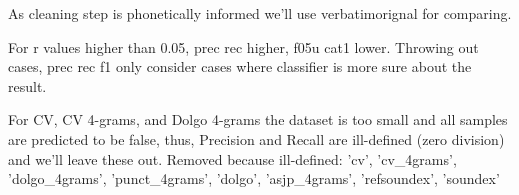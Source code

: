 

As cleaning step is phonetically informed we'll use verbatimorignal for comparing.

For r values higher than 0.05, prec rec higher, f05u cat1 lower.
Throwing out cases, prec rec f1 only consider cases where classifier is more sure about the result.


For CV, CV 4-grams, and Dolgo 4-grams the dataset is too small and all samples are predicted to be false, thus, Precision and Recall are ill-defined (zero division) and we'll leave these out.
Removed because ill-defined: 'cv', 'cv_4grams', 'dolgo_4grams', 'punct_4grams', 'dolgo', 'asjp_4grams', 'refsoundex', 'soundex'





